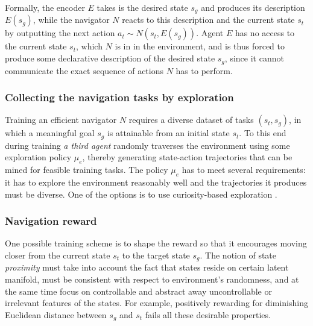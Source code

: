 \documentclass[acmsmall, nonacm]{acmart}
\begin{document}
Formally, the encoder $E$ takes is the desired state $s_g$ and produces its description $E(s_g)$, while the navigator $N$ reacts to this description and the current state $s_t$ by outputting the next action $a_t \sim N(s_t, E(s_g))$. Agent $E$ has no access to the current state $s_t$, which $N$ is in in the environment, and is thus forced to produce some declarative description of the desired state $s_g$, since it cannot communicate the exact sequence of actions $N$ has to perform.

\subsubsection{Collecting the navigation tasks by exploration}

Training an efficient navigator $N$ requires a diverse dataset of tasks $(s_t, s_g)$, in which a meaningful goal $s_g$ is attainable from an initial state $s_t$. To this end during training \emph{a third agent} randomly traverses the environment using some exploration policy $\mu_e$, thereby generating state-action trajectories that can be mined for feasible training tasks. The policy $\mu_e$ has to meet several requirements: it has to explore the environment reasonably well and the trajectories it produces must be diverse. One of the options is to use curiosity-based exploration \citep{pathak_curiosity-driven_2017,burda_exploration_2019}.

\subsubsection{Navigation reward}
\label{ssub:navigation_reward}

One possible training scheme is to shape the reward so that it encourages moving closer from the current state $s_t$ to the target state $s_g$. The notion of state \emph{proximity} must take into account the fact that states reside on certain latent manifold, must be consistent with respect to environment's randomness, and at the same time focus on controllable and abstract away uncontrollable or irrelevant features of the states. For example, positively rewarding for diminishing Euclidean distance between $s_g$ and $s_t$ fails all these desirable properties.
\end{document}
